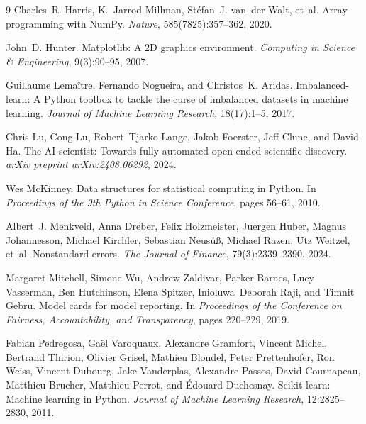 \documentclass{article}
\begin{document}
\begin{thebibliography}{9}
Charles~R. Harris, K.~Jarrod Millman, St{\'e}fan~J. van~der Walt, et~al.
\newblock Array programming with {NumPy}.
\newblock \emph{Nature}, 585(7825):357--362, 2020.

John~D. Hunter.
\newblock Matplotlib: A {2D} graphics environment.
\newblock \emph{Computing in Science \& Engineering}, 9(3):90--95, 2007.

Guillaume Lema{\^i}tre, Fernando Nogueira, and Christos~K. Aridas.
\newblock Imbalanced-learn: A {P}ython toolbox to tackle the curse of imbalanced datasets in
machine learning.
\newblock \emph{Journal of Machine Learning Research}, 18(17):1--5, 2017.

Chris Lu, Cong Lu, Robert~Tjarko Lange, Jakob Foerster, Jeff Clune, and David Ha.
\newblock The {AI} scientist: Towards fully automated open-ended scientific discovery.
\newblock \emph{arXiv preprint arXiv:2408.06292}, 2024.

Wes McKinney.
\newblock Data structures for statistical computing in {P}ython.
\newblock In \emph{Proceedings of the 9th Python in Science Conference}, pages 56--61, 2010.

Albert~J. Menkveld, Anna Dreber, Felix Holzmeister, Juergen Huber, Magnus Johannesson,
Michael Kirchler, Sebastian Neus{\"u}{\ss}, Michael Razen, Utz Weitzel, et~al.
\newblock Nonstandard errors.
\newblock \emph{The Journal of Finance}, 79(3):2339--2390, 2024.

Margaret Mitchell, Simone Wu, Andrew Zaldivar, Parker Barnes, Lucy Vasserman, Ben
Hutchinson, Elena Spitzer, Inioluwa~Deborah Raji, and Timnit Gebru.
\newblock Model cards for model reporting.
\newblock In \emph{Proceedings of the Conference on Fairness, Accountability, and
Transparency}, pages 220--229, 2019.

Fabian Pedregosa, Ga{\"e}l Varoquaux, Alexandre Gramfort, Vincent Michel, Bertrand Thirion,
Olivier Grisel, Mathieu Blondel, Peter Prettenhofer, Ron Weiss, Vincent Dubourg, Jake
Vanderplas, Alexandre Passos, David Cournapeau, Matthieu Brucher, Matthieu Perrot, and
{\'E}douard Duchesnay.
\newblock Scikit-learn: Machine learning in {P}ython.
\newblock \emph{Journal of Machine Learning Research}, 12:2825--2830, 2011.


\end{thebibliography}
\end{document}
